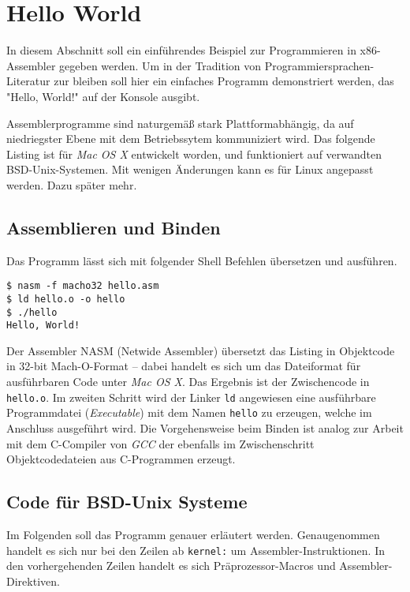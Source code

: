 \section{Hello World}

In diesem Abschnitt soll ein einführendes Beispiel zur Programmieren in x86-Assembler gegeben werden. Um in der Tradition von Programmiersprachen-Literatur zur bleiben soll hier ein einfaches Programm demonstriert werden, das "Hello, World!" auf der Konsole ausgibt.

Assemblerprogramme sind naturgemäß stark Plattformabhängig, da auf niedriegster Ebene mit dem Betriebssytem kommuniziert wird.
Das folgende Listing ist für \emph{Mac OS X} entwickelt worden, und 
funktioniert auf verwandten BSD-Unix-Systemen. Mit wenigen Änderungen kann es für Linux angepasst werden. Dazu später mehr.

\subsection{Assemblieren und Binden}

Das Programm lässt sich mit folgender Shell Befehlen übersetzen und ausführen.

\begin{lstlisting}[caption=Assemblieren und Binden von hello.asm]
$ nasm -f macho32 hello.asm
$ ld hello.o -o hello
$ ./hello
Hello, World!
\end{lstlisting}

Der Assembler NASM (Netwide Assembler) übersetzt das Listing in Objektcode in 32-bit Mach-O-Format – dabei handelt es sich um das Dateiformat für ausführbaren Code unter \emph{Mac OS X}. Das Ergebnis ist der Zwischencode in \texttt{hello.o}. Im zweiten Schritt wird der Linker \texttt{ld} angewiesen eine ausführbare Programmdatei (\emph{Executable}) mit dem Namen \texttt{hello} zu erzeugen, welche im Anschluss ausgeführt wird. Die Vorgehensweise beim Binden ist analog zur Arbeit mit dem C-Compiler von \emph{GCC} der ebenfalls im Zwischenschritt Objektcodedateien aus C-Programmen erzeugt.

\subsection{Code für BSD-Unix Systeme}

Im Folgenden soll das Programm genauer erläutert werden. Genaugenommen handelt es sich nur bei den Zeilen ab \texttt{kernel:} um Assembler-Instruktionen. In den vorhergehenden Zeilen handelt es sich Präprozessor-Macros und Assembler-Direktiven.

